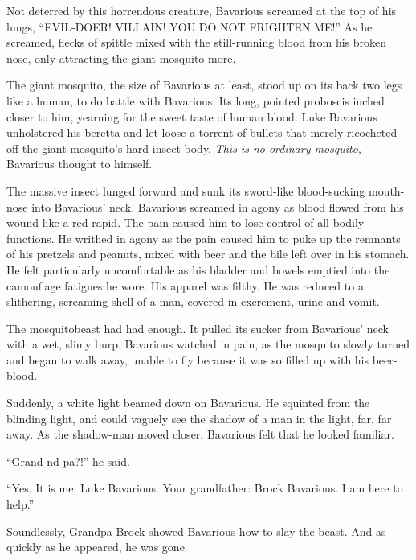 Not deterred by this horrendous creature, Bavarious screamed at the
top of his lungs, ``EVIL-DOER! VILLAIN! YOU DO NOT FRIGHTEN
ME!'' As he screamed, flecks of spittle mixed with the
still-running blood from his broken nose, only attracting the giant
mosquito more.



The giant mosquito, the size of Bavarious at least, stood up on its
back two legs like a human, to do battle with Bavarious. Its long,
pointed proboscis inched closer to him, yearning for the sweet
taste of human blood. Luke Bavarious unholstered his beretta and
let loose a torrent of bullets that merely ricocheted off the giant
mosquito's hard insect body. {\em This is no ordinary
mosquito}, Bavarious thought to himself.



The massive insect lunged forward and sunk its sword-like
blood-sucking mouth-nose into Bavarious' neck. Bavarious
screamed in agony as blood flowed from his wound like a red rapid.
The pain caused him to lose control of all bodily functions. He
writhed in agony as the pain caused him to puke up the remnants of
his pretzels and peanuts, mixed with beer and the bile left over in
his stomach. He felt particularly uncomfortable as his bladder and
bowels emptied into the camouflage fatigues he wore. His apparel
was filthy. He was reduced to a slithering, screaming shell of a
man, covered in excrement, urine and vomit.



The mosquitobeast had had enough. It pulled its sucker from
Bavarious' neck with a wet, slimy burp. Bavarious watched in
pain, as the mosquito slowly turned and began to walk away, unable
to fly because it was so filled up with his beer-blood.



Suddenly, a white light beamed down on Bavarious. He squinted from
the blinding light, and could vaguely see the shadow of a man in
the light, far, far away. As the shadow-man moved closer, Bavarious
felt that he looked familiar.



``Grand-nd-pa?!'' he said.



``Yes. It is me, Luke Bavarious. Your grandfather: Brock
Bavarious. I am here to help.''



Soundlessly, Grandpa Brock showed Bavarious how to slay the beast.
And as quickly as he appeared, he was gone.



